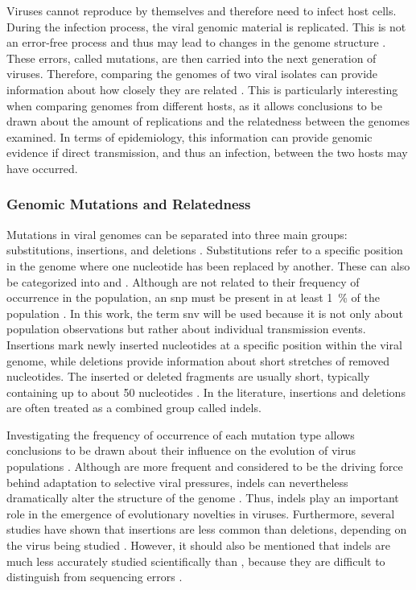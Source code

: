Viruses cannot reproduce by themselves and therefore need to infect host cells. During the infection process, the viral genomic material is replicated. This is not an error-free process and thus may lead to changes in the genome structure \cite{Can1}. These errors, called mutations, are then carried into the next generation of viruses. Therefore, comparing the genomes of two viral isolates can provide information about how closely they are related \cite{Gru1}. This is particularly interesting when comparing genomes from different hosts, as it allows conclusions to be drawn about the amount of replications and the relatedness between the genomes examined. In terms of epidemiology, this information can provide genomic evidence if direct transmission, and thus an infection, between the two hosts may have occurred.

\subsubsection{Genomic Mutations and Relatedness}
\label{sec:viral_mutation_dynamics_and_isolate_relatedness}
Mutations in viral genomes can be separated into three main groups: substitutions, insertions, and deletions \cite{Bak1}. Substitutions refer to a specific position in the genome where one nucleotide has been replaced by another. These can also be categorized into  and . Although  are not related to their frequency of occurrence in the population, an \acrshort{snp} must be present in at least 1~\% of the population \cite{Gar1}. In this work, the term \acrshort{snv} will be used because it is not only about population observations but rather about individual transmission events. 
Insertions mark newly inserted nucleotides at a specific position within the viral genome, while deletions provide information about short stretches of removed nucleotides. The inserted or deleted fragments are usually short, typically containing up to about 50 nucleotides \cite{Gar1}. In the literature, insertions and deletions are often treated as a combined group called indels. 

Investigating the frequency of occurrence of each mutation type allows conclusions to be drawn about their influence on the evolution of virus populations \cite{Bak1}. Although  are more frequent and considered to be the driving force behind adaptation to selective viral pressures, indels can nevertheless dramatically alter the structure of the genome \cite{Bak1}. Thus, indels play an important role in the emergence of evolutionary novelties in viruses. Furthermore, several studies have shown that insertions are less common than deletions, depending on the virus being studied \cite{Ele1,Ran1}. However, it should also be mentioned that indels are much less accurately studied scientifically than , because they are difficult to distinguish from sequencing errors \cite{Ele1}.

